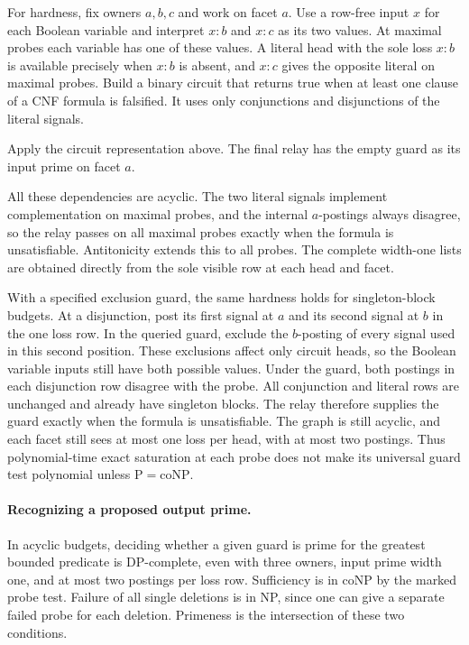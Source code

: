 For hardness, fix owners $a,b,c$ and work on
facet $a$. Use a row-free input $x$ for each
Boolean variable and interpret $x:b$ and $x:c$
as its two values. At maximal probes each
variable has one of these values. A literal
head with the sole loss $x:b$ is available
precisely when $x:b$ is absent, and $x:c$
gives the opposite literal on maximal probes.
Build a binary circuit that returns true
when at least one clause of a CNF formula
is falsified. It uses only conjunctions and
disjunctions of the literal signals.

Apply the circuit representation above.
The final relay has the empty guard as
its input prime on facet $a$.

All these dependencies are acyclic. The two
literal signals implement complementation on
maximal probes, and the internal $a$-postings
always disagree, so the relay passes on all
maximal probes exactly when the formula is
unsatisfiable. Antitonicity extends this to all
probes. The complete width-one lists are
obtained directly from the sole visible row
at each head and facet.

With a specified exclusion guard, the same
hardness holds for singleton-block budgets.
At a disjunction, post its first signal at
$a$ and its second signal at $b$ in the
one loss row. In the queried guard, exclude
the $b$-posting of every signal used in
this second position. These exclusions
affect only circuit heads, so the Boolean
variable inputs still have both possible
values. Under the guard, both postings in
each disjunction row disagree with the
probe. All conjunction and literal rows
are unchanged and already have singleton
blocks. The relay therefore supplies the
guard exactly when the formula is
unsatisfiable. The graph is still acyclic,
and each facet still sees at most one
loss per head, with at most two postings.
Thus polynomial-time exact saturation at
each probe does not make its universal
guard test polynomial unless
$\mathrm P=\mathrm{coNP}$.

\paragraph{Recognizing a proposed output prime.}
In acyclic budgets, deciding whether a given
guard is prime for the greatest bounded predicate
is $\mathrm{DP}$-complete, even with three owners,
input prime width one, and at most two postings
per loss row. Sufficiency is in coNP by the
marked probe test. Failure of all single
deletions is in NP, since one can give a
separate failed probe for each deletion.
Primeness is the intersection of these two
conditions.


